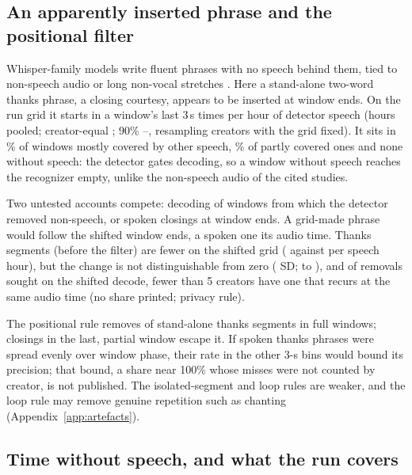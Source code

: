 \subsection{An apparently inserted phrase and the positional filter}
\label{sec:artefacts}

Whisper-family models write fluent phrases with no speech behind them, tied to non-speech audio or long non-vocal
stretches \cite{koenecke2024careless,baranski2025investigation}. Here a stand-alone two-word thanks phrase, a closing
courtesy, appears to be inserted at window ends. On the run grid it starts in a window's last 3\,s
\ThanksPerSpeechHour{} times per hour of detector speech (hours pooled; creator-equal \ThanksPerSpeechHourCreator; 90\%
\ThanksPerSpeechHourLo--\ThanksPerSpeechHourHi, resampling creators with the grid fixed). It sits in
\ThanksPerWindowPct\% of windows mostly covered by other speech, \ThanksPerWindowPartialPct\% of partly covered ones and
none without speech: the detector gates decoding, so a window without speech reaches the recognizer empty, unlike the
non-speech audio of the cited studies.

Two untested accounts compete: decoding of windows from which the detector removed non-speech, or spoken closings at
window ends. A grid-made phrase would follow the shifted window ends, a spoken one its audio time. Thanks segments
(before the filter) are fewer on the shifted grid (\GsThanksRunRate{} against \GsThanksShiftRate{} per speech hour),
but the change is not distinguishable from zero (\GsThanksSd{} SD; \GsThanksSdLo{} to \GsThanksSdHi), and of
\GsPrecisionRemoved{} removals sought on the shifted decode, fewer than 5 creators have one that recurs at the same
audio time (no share printed; privacy rule).

The positional rule removes \ThanksLateSegments{} of \ThanksStandalone{} stand-alone thanks segments in full windows;
closings in the last, partial window escape it. If spoken thanks phrases were spread evenly over window phase, their
rate in the other 3-s bins would bound its precision; that bound, a share near 100\% whose misses were not counted
by creator, is not published. The isolated-segment and loop rules are weaker, and the loop rule may remove genuine
repetition such as chanting (Appendix~\ref{app:artefacts}).

\subsection{Time without speech, and what the run covers}
\label{sec:nonspeech}

